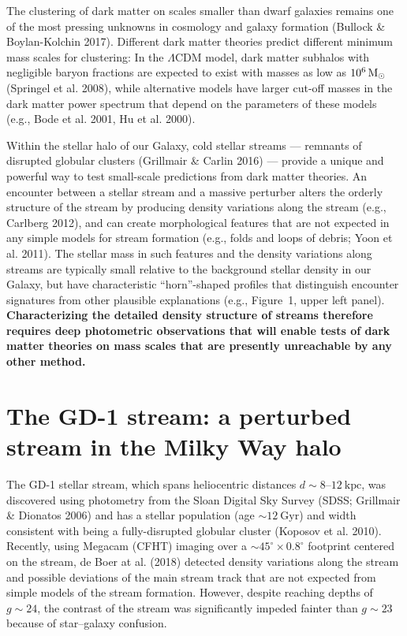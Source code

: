 \documentclass[11pt]{article}
\date{}
\author{}
\begin{document}
\maketitle

\vspace{-1em}
The clustering of dark matter on scales smaller than dwarf galaxies remains one of the most pressing unknowns in cosmology and galaxy formation (Bullock \& Boylan-Kolchin 2017).
Different dark matter theories predict different minimum mass scales for clustering: In the $\Lambda$CDM model, dark matter subhalos with negligible baryon fractions are expected to exist with masses as low as $10^{6}\rm\,M_\odot$ (Springel et al. 2008), while alternative models have larger cut-off masses in the dark matter power spectrum that depend on the parameters of these models (e.g., Bode et al. 2001, Hu et al. 2000).

Within the stellar halo of our Galaxy, cold stellar streams --- remnants of disrupted globular clusters (Grillmair \& Carlin 2016) --- provide a unique and powerful way to test small-scale predictions from dark matter theories.
An encounter between a stellar stream and a massive perturber alters the orderly structure of the stream by producing density variations along the stream (e.g., Carlberg 2012), and can create morphological features that are not expected in any simple models for stream formation (e.g., folds and loops of debris; Yoon et al. 2011).
The stellar mass in such features and the density variations along streams are typically small relative to the background stellar density in our Galaxy, but have characteristic ``horn''-shaped profiles that distinguish encounter signatures from other plausible explanations (e.g., Figure~1, upper left panel).
\textbf{Characterizing the detailed density structure of streams therefore requires deep photometric observations that will enable tests of dark matter theories on mass scales that are presently unreachable by any other method.}

\section*{The GD-1 stream: a perturbed stream in the Milky Way halo}

The GD-1 stellar stream, which spans heliocentric distances $d\sim 8$--$12~\textrm{kpc}$, was discovered using photometry from the Sloan Digital Sky Survey (SDSS; Grillmair \& Dionatos 2006) and has a stellar population (age $\sim 12~\textrm{Gyr}$) and width consistent with being a fully-disrupted globular cluster (Koposov et al. 2010).
Recently, using Megacam (CFHT) imaging over a $\sim 45^\circ \times 0.8^\circ$ footprint centered on the stream, de Boer at al. (2018) detected density variations along the stream and possible deviations of the main stream track that are not expected from simple models of the stream formation.
However, despite reaching depths of $g \sim 24$, the contrast of the stream was significantly impeded fainter than $g \sim 23$ because of star--galaxy confusion.
\end{document}
